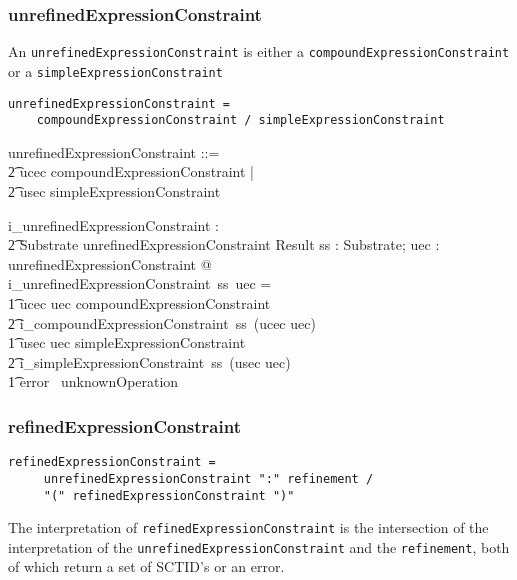 \documentclass{article}
\def\spec#1{{\tt #1}}
\begin{document}
\subsubsection{unrefinedExpressionConstraint}
An \spec{unrefinedExpressionConstraint} is either a \spec{compoundExpressionConstraint} or a \spec{simpleExpressionConstraint}

\begin{verbatim}
unrefinedExpressionConstraint = 
    compoundExpressionConstraint / simpleExpressionConstraint
\end{verbatim}

\begin{zed}
unrefinedExpressionConstraint ::= \\
\t2 ucec \ldata compoundExpressionConstraint \rdata | \\
\t2 usec \ldata simpleExpressionConstraint \rdata
\end{zed}
\begin{gendef}
   i\_unrefinedExpressionConstraint : \\
\t2 Substrate \fun unrefinedExpressionConstraint \fun Result
\where
   \forall ss : Substrate; uec : unrefinedExpressionConstraint @  \\
   i\_unrefinedExpressionConstraint~ss~uec = \\
\t1 \IF ucec \inv uec \in compoundExpressionConstraint \\
\t2 \THEN i\_compoundExpressionConstraint~ss~(ucec \inv uec) \\
\t1 \ELSE \IF usec \inv uec \in simpleExpressionConstraint  \\
\t2 \THEN i\_simpleExpressionConstraint~ss~(usec \inv uec) \\
\t1 \ELSE  error~ unknownOperation
\end{gendef}

\subsubsection{refinedExpressionConstraint}
\begin{verbatim}
refinedExpressionConstraint = 
     unrefinedExpressionConstraint ":" refinement /		
     "(" refinedExpressionConstraint ")"
\end{verbatim}

The interpretation of \spec{refinedExpressionConstraint} is the intersection of the interpretation of
the \spec{unrefinedExpressionConstraint} and the \spec{refinement}, both of which return a set of SCTID's or
an error.
\end{document}
